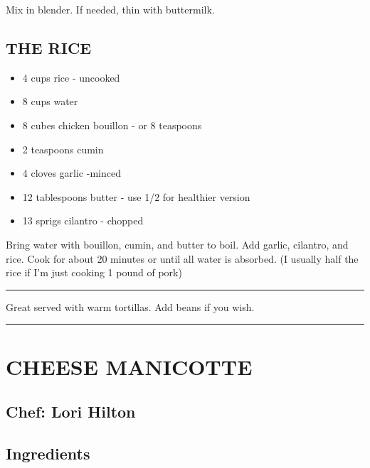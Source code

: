 \documentclass[
]{book}
\providecommand{\tightlist}{%
  \setlength{\itemsep}{0pt}\setlength{\parskip}{0pt}}
\begin{document}
Mix in blender. If needed, thin with buttermilk.

\hypertarget{the-rice}{%
\subsection*{THE RICE}\label{the-rice}}


\begin{itemize}
\tightlist
\item
  4 cups rice - uncooked
\item
  8 cups water
\item
  8 cubes chicken bouillon - or 8 teaspoons
\item
  2 teaspoons cumin
\item
  4 cloves garlic -minced
\item
  12 tablespoons butter - use 1/2 for healthier version
\item
  13 sprigs cilantro - chopped
\end{itemize}

Bring water with bouillon, cumin, and butter to boil. Add garlic, cilantro,
and rice. Cook for about 20 minutes or until all water is absorbed.
(I usually half the rice if I'm just cooking 1 pound of pork)

\begin{center}\rule{0.5\linewidth}{0.5pt}\end{center}

Great served with warm tortillas. Add beans if you wish.

\begin{center}\rule{0.5\linewidth}{0.5pt}\end{center}

\hypertarget{cheese-manicotte}{%
\section*{CHEESE MANICOTTE}\label{cheese-manicotte}}


\hypertarget{chef-lori-hilton-3}{%
\subsection*{Chef: Lori Hilton}\label{chef-lori-hilton-3}}


\hypertarget{ingredients-46}{%
\subsection*{Ingredients}\label{ingredients-46}}
\end{document}
